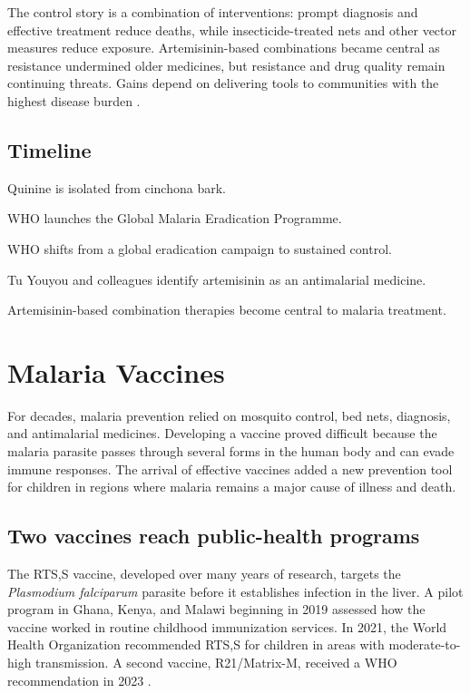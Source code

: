 \documentclass[12pt,oneside]{book}
\begin{document}
The control story is a combination of interventions: prompt diagnosis and
effective treatment reduce deaths, while insecticide-treated nets and other
vector measures reduce exposure. Artemisinin-based combinations became central
as resistance undermined older medicines, but resistance and drug quality
remain continuing threats. Gains depend on delivering tools to communities
with the highest disease burden
\cite{nobelArtemisinin,cdcMalariaTreatment,whoMalariaHistory}.

\section*{Timeline}
\begin{description}[leftmargin=2.3cm,style=nextline]
  \item[1820] Quinine is isolated from cinchona bark.
  \item[1955] WHO launches the Global Malaria Eradication Programme.
  \item[1969] WHO shifts from a global eradication campaign to sustained control.
  \item[1970s] Tu Youyou and colleagues identify artemisinin as an antimalarial medicine.
  \item[2000s] Artemisinin-based combination therapies become central to malaria treatment.
\end{description}

\chapter[Malaria Vaccines]{Malaria Vaccines}

For decades, malaria prevention relied on mosquito control, bed nets,
diagnosis, and antimalarial medicines. Developing a vaccine proved difficult
because the malaria parasite passes through several forms in the human body
and can evade immune responses. The arrival of effective vaccines added a
new prevention tool for children in regions where malaria remains a major
cause of illness and death.

\section{Two vaccines reach public-health programs}
The RTS,S vaccine, developed over many years of research, targets the
\emph{Plasmodium falciparum} parasite before it establishes infection in the
liver. A pilot program in Ghana, Kenya, and Malawi beginning in 2019 assessed
how the vaccine worked in routine childhood immunization services. In 2021,
the World Health Organization recommended RTS,S for children in areas with
moderate-to-high transmission. A second vaccine, R21/Matrix-M, received a
WHO recommendation in 2023 \cite{whoMalariaVaccinePaper,whoMalariaVaccineUpdate}.
\end{document}
